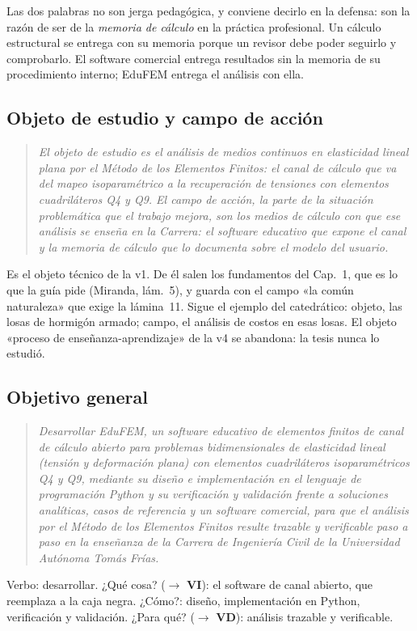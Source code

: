 \documentclass[11pt,a4paper]{article}
\newcommand{\vi}{\textbf{VI}}
\newcommand{\vd}{\textbf{VD}}
\newcommand{\molde}[1]{\textcolor{blue!60!black}{\small #1}}
\newcommand{\pegar}[1]{\begin{quote}\itshape #1\end{quote}}
\begin{document}
Las dos palabras no son jerga pedagógica, y conviene decirlo en la defensa: son la razón de ser de la \emph{memoria de cálculo} en la práctica profesional. Un cálculo estructural se entrega con su memoria porque un revisor debe poder seguirlo y comprobarlo. El software comercial entrega resultados sin la memoria de su procedimiento interno; EduFEM entrega el análisis con ella.

\subsection{Objeto de estudio y campo de acción}

\pegar{El objeto de estudio es el análisis de medios continuos en elasticidad lineal plana por el Método de los Elementos Finitos: el canal de cálculo que va del mapeo isoparamétrico a la recuperación de tensiones con elementos cuadriláteros Q4 y Q9. El campo de acción, la parte de la situación problemática que el trabajo mejora, son los medios de cálculo con que ese análisis se enseña en la Carrera: el software educativo que expone el canal y la memoria de cálculo que lo documenta sobre el modelo del usuario.}

Es el objeto técnico de la v1. De él salen los fundamentos del Cap.~1, que es lo que la guía pide (Miranda, lám.~5), y guarda con el campo «la común naturaleza» que exige la lámina~11. Sigue el ejemplo del catedrático: objeto, las losas de hormigón armado; campo, el análisis de costos en esas losas. El objeto «proceso de enseñanza-aprendizaje» de la v4 se abandona: la tesis nunca lo estudió.

\subsection{Objetivo general}

\pegar{Desarrollar EduFEM, un software educativo de elementos finitos de canal de cálculo abierto para problemas bidimensionales de elasticidad lineal (tensión y deformación plana) con elementos cuadriláteros isoparamétricos Q4 y Q9, mediante su diseño e implementación en el lenguaje de programación Python y su verificación y validación frente a soluciones analíticas, casos de referencia y un software comercial, para que el análisis por el Método de los Elementos Finitos resulte trazable y verificable paso a paso en la enseñanza de la Carrera de Ingeniería Civil de la Universidad Autónoma Tomás Frías.}

\molde{Verbo: desarrollar. ¿Qué cosa? ($\to$ \vi): el software de canal abierto, que reemplaza a la caja negra. ¿Cómo?: diseño, implementación en Python, verificación y validación. ¿Para qué? ($\to$ \vd): análisis trazable y verificable.}
\end{document}
